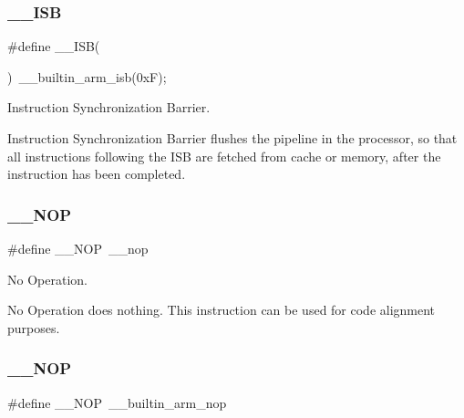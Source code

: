 \subsubsection{\texorpdfstring{\+\_\+\+\_\+\+I\+SB}{\_\_ISB}\hspace{0.1cm}{\footnotesize\ttfamily [2/2]}}
{\footnotesize\ttfamily \#define \+\_\+\+\_\+\+I\+SB(\begin{DoxyParamCaption}{ }\end{DoxyParamCaption})~\+\_\+\+\_\+builtin\+\_\+arm\+\_\+isb(0x\+F);}



Instruction Synchronization Barrier. 

Instruction Synchronization Barrier flushes the pipeline in the processor, so that all instructions following the I\+SB are fetched from cache or memory, after the instruction has been completed. \mbox{\label{group___c_m_s_i_s___core___instruction_interface_gabd585ddc865fb9b7f2493af1eee1a572}} 
\subsubsection{\texorpdfstring{\+\_\+\+\_\+\+N\+OP}{\_\_NOP}\hspace{0.1cm}{\footnotesize\ttfamily [1/2]}}
{\footnotesize\ttfamily \#define \+\_\+\+\_\+\+N\+OP~\+\_\+\+\_\+nop}



No Operation. 

No Operation does nothing. This instruction can be used for code alignment purposes. \mbox{\label{group___c_m_s_i_s___core___instruction_interface_gabd585ddc865fb9b7f2493af1eee1a572}} 
\subsubsection{\texorpdfstring{\+\_\+\+\_\+\+N\+OP}{\_\_NOP}\hspace{0.1cm}{\footnotesize\ttfamily [2/2]}}
{\footnotesize\ttfamily \#define \+\_\+\+\_\+\+N\+OP~\+\_\+\+\_\+builtin\+\_\+arm\+\_\+nop}



